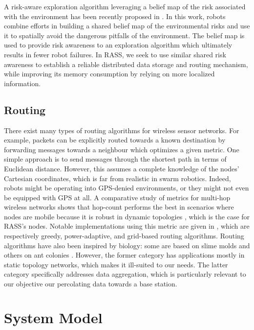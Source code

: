 A risk-aware exploration algorithm leveraging a belief map of the risk
associated with the environment has been recently proposed in
\cite{vielfaure2021dora}. In this work, robots combine efforts in building a shared belief map of the environmental risks and use it to spatially avoid the dangerous
pitfalls of the environment. The belief map is used to provide risk
awareness to an exploration algorithm which ultimately results in
fewer robot failures. In \ac{RASS}, we seek to use similar shared risk awareness to establish a reliable distributed data storage and
routing mechanism, while improving its memory consumption by relying on more localized information.

\subsection{Routing}

There exist many types of routing algorithms for wireless sensor
networks. For example, packets can be explicitly routed towards a known destination
by forwarding messages towards a neighbour which optimizes a given
metric. One simple approach is to send messages through the
shortest path in terms of Euclidean distance. However, this assumes a
complete knowledge of the nodes' Cartesian coordinates, which is far
from realistic in swarm robotics. Indeed, robots might be operating
into GPS-denied environments, or they might not even be equipped with
GPS at all. A comparative study of metrics for multi-hop wireless networks shows
that hop-count performs the best in scenarios where nodes are mobile
\cite{draves2004comparison} because it is robust in dynamic topologies
\cite{watteyne2009implementation}, which is the case for \ac{RASS}'s
nodes. Notable implementations using this metric are given in
\cite{kuruvila2005hop,zhang2014efficient,al2019efficient}, which are
respectively greedy, power-adaptive, and grid-based routing algorithms.
Routing algorithms have also been inspired by biology: some are based
on slime molds \cite{li2011slime,jiang2018toward} and others on ant
colonies \cite{jiang2018effective,liao2008data}. However, the
former category has applications mostly in static topology networks,
which makes it ill-suited to our needs. The latter category
specifically addresses data aggregation, which is particularly
relevant to our objective our percolating data towards a base station.


\section{System Model}
\label{systemmodel}

